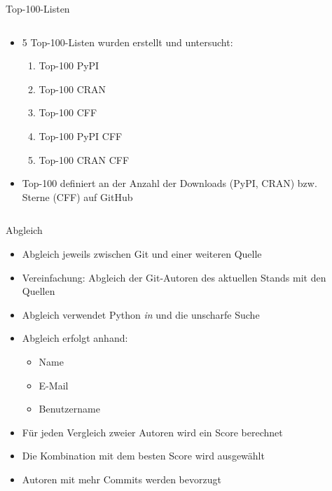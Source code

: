 \documentclass[%
    handout,
    aspectratio=1610,
    10pt,
    onlytextwidth, %
]{beamer}
\begin{document}
\begin{frame}{Top-100-Listen}
    \begin{columns}
        \begin{column}[t]{0.39\textwidth}
            \begin{itemize}
                \item 5 Top-100-Listen wurden erstellt und untersucht:
                \begin{enumerate}
                    \item Top-100 PyPI
                    \item Top-100 CRAN
                    \item Top-100 CFF
                    \item Top-100 PyPI CFF
                    \item Top-100 CRAN CFF
                \end{enumerate}
                \item Top-100 definiert an der Anzahl der Downloads (PyPI, CRAN) bzw. Sterne (CFF) auf GitHub
            \end{itemize}
        \end{column}
        \begin{column}[t]{0.59\textwidth}
            \begin{center}
                
            \end{center}
        \end{column}
    \end{columns}
\end{frame}

\begin{frame}{Abgleich}
    \begin{itemize}
        \item Abgleich jeweils zwischen Git und einer weiteren Quelle
        \item Vereinfachung: Abgleich der Git-Autoren des aktuellen Stands mit den Quellen
        \item Abgleich verwendet Python \emph{in} und die unscharfe Suche
        \item Abgleich erfolgt anhand:
        \begin{itemize}
            \item Name
            \item E-Mail
            \item Benutzername
        \end{itemize}
        \item Für jeden Vergleich zweier Autoren wird ein Score berechnet
        \item Die Kombination mit dem besten Score wird ausgewählt
        \item Autoren mit mehr Commits werden bevorzugt
    \end{itemize}
\end{frame}
\end{document}
